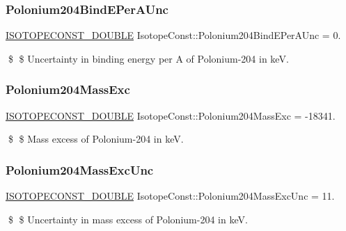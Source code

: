 \subsubsection{\texorpdfstring{Polonium204\+Bind\+E\+Per\+A\+Unc}{Polonium204BindEPerAUnc}}
{\footnotesize\ttfamily \mbox{\hyperlink{group___isotope_const-_macros_ga8f45a7272ce02c0b4c65c44636ed719a}{I\+S\+O\+T\+O\+P\+E\+C\+O\+N\+S\+T\+\_\+\+D\+O\+U\+B\+LE}} Isotope\+Const\+::\+Polonium204\+Bind\+E\+Per\+A\+Unc = 0.}

\$ \$ Uncertainty in binding energy per A of Polonium-\/204 in keV. \mbox{\label{group___isotope_const-_polonium-_po204_gad77a738fce09d572a5e723b055902d64}} 
\subsubsection{\texorpdfstring{Polonium204\+Mass\+Exc}{Polonium204MassExc}}
{\footnotesize\ttfamily \mbox{\hyperlink{group___isotope_const-_macros_ga8f45a7272ce02c0b4c65c44636ed719a}{I\+S\+O\+T\+O\+P\+E\+C\+O\+N\+S\+T\+\_\+\+D\+O\+U\+B\+LE}} Isotope\+Const\+::\+Polonium204\+Mass\+Exc = -\/18341.}

\$ \$ Mass excess of Polonium-\/204 in keV. \mbox{\label{group___isotope_const-_polonium-_po204_ga5f260ecbc705d9eacb0f51855bdbae01}} 
\subsubsection{\texorpdfstring{Polonium204\+Mass\+Exc\+Unc}{Polonium204MassExcUnc}}
{\footnotesize\ttfamily \mbox{\hyperlink{group___isotope_const-_macros_ga8f45a7272ce02c0b4c65c44636ed719a}{I\+S\+O\+T\+O\+P\+E\+C\+O\+N\+S\+T\+\_\+\+D\+O\+U\+B\+LE}} Isotope\+Const\+::\+Polonium204\+Mass\+Exc\+Unc = 11.}

\$ \$ Uncertainty in mass excess of Polonium-\/204 in keV. \mbox{\label{group___isotope_const-_polonium-_po204_ga30abcdd1a0dcdd8eb8d7f76cf4bbdb66}} 
